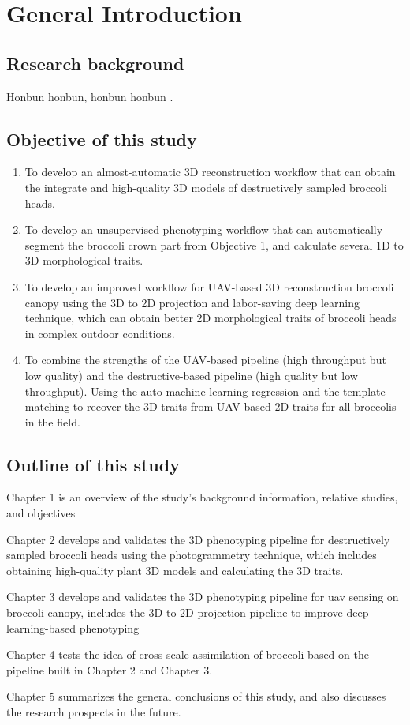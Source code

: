 \chapter{General Introduction}

\section{Research background}

Honbun honbun, honbun honbun \citep{guo_deep_2019, zhao_crop_2019}. 


\section{Objective of this study}

\begin{enumerate}
    \item To develop an almost-automatic 3D reconstruction workflow that can obtain the integrate and high-quality 3D models of destructively sampled broccoli heads.
    \item To develop an unsupervised phenotyping workflow that can automatically segment the broccoli crown part from Objective 1, and calculate several 1D to 3D morphological traits.
    \item To develop an improved workflow for UAV-based 3D reconstruction broccoli canopy using the 3D to 2D projection and labor-saving deep learning technique, which can obtain better 2D morphological traits of broccoli heads in complex outdoor conditions.
    \item To combine the strengths of the UAV-based pipeline (high throughput but low quality) and the destructive-based pipeline (high quality but low throughput). Using the auto machine learning regression and the template matching to recover the 3D traits from UAV-based 2D traits for all broccolis in the field.

\end{enumerate}


\section{Outline of this study}

Chapter 1 is an overview of the study's background information, relative studies, and objectives

Chapter 2 develops and validates the 3D phenotyping pipeline for destructively sampled broccoli heads using the photogrammetry technique, which includes obtaining high-quality plant 3D models and calculating the 3D traits.


Chapter 3 develops and validates the 3D phenotyping pipeline for \gls{uav} sensing on broccoli canopy, includes the 3D to 2D projection pipeline to improve deep-learning-based phenotyping

Chapter 4 tests the idea of cross-scale assimilation of broccoli based on the pipeline built in Chapter 2 and Chapter 3.

Chapter 5 summarizes the general conclusions of this study, and also discusses the research prospects in the future.